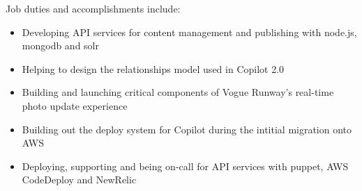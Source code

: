 \normalsize
Job duties and accomplishments include:
\small
\begin{itemize}
    \item Developing API services for content management and publishing with node.js, mongodb and solr
    \item Helping to design the relationships model used in Copilot 2.0
    \item Building and launching critical components of Vogue Runway's real-time photo update experience\
    \item Building out the deploy system for Copilot during the intitial migration onto AWS
    \item Deploying, supporting and being on-call for API services with puppet, AWS CodeDeploy and NewRelic
\end{itemize}
\normalsize
\medskip